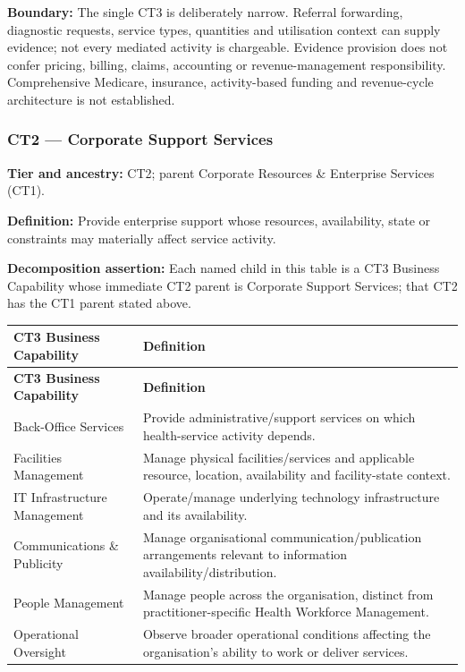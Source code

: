 \textbf{Boundary:} The single CT3 is deliberately narrow. Referral forwarding, diagnostic requests, service types, quantities and utilisation context can supply evidence; not every mediated activity is chargeable. Evidence provision does not confer pricing, billing, claims, accounting or revenue-management responsibility. Comprehensive Medicare, insurance, activity-based funding and revenue-cycle architecture is not established.

\label{rad:business:970}
\subsubsection*{CT2 — Corporate Support Services}
\label{rad:business:972}

\textbf{Tier and ancestry:} CT2; parent Corporate Resources \& Enterprise Services (CT1).

\label{rad:business:974}

\textbf{Definition:} Provide enterprise support whose resources, availability, state or constraints may materially affect service activity.

\label{rad:business:976}

\textbf{Decomposition assertion:} Each named child in this table is a CT3 Business Capability whose immediate CT2 parent is Corporate Support Services; that CT2 has the CT1 parent stated above.

\label{rad:business:978}
\begingroup\small\setlength{\TableWidth}{\dimexpr\linewidth-4\tabcolsep-3\arrayrulewidth\relax}
\begin{longtable}{|>{\raggedright\arraybackslash}p{0.35\TableWidth}|>{\raggedright\arraybackslash}p{0.65\TableWidth}|}
\hline\rowcolor{TableHead}\textbf{CT3 Business Capability} & \textbf{Definition}\\\hline\endfirsthead
\hline\rowcolor{TableHead}\textbf{CT3 Business Capability} & \textbf{Definition}\\\hline\endhead
\hline\endfoot
Back-Office Services & Provide administrative/\allowbreak{}support services on which health-service activity depends.\\\hline
Facilities Management & Manage physical facilities/\allowbreak{}services and applicable resource, location, availability and facility-state context.\\\hline
IT Infrastructure Management & Operate/\allowbreak{}manage underlying technology infrastructure and its availability.\\\hline
Communications \& Publicity & Manage organisational communication/\allowbreak{}publication arrangements relevant to information availability/\allowbreak{}distribution.\\\hline
People Management & Manage people across the organisation, distinct from practitioner-specific Health Workforce Management.\\\hline
Operational Oversight & Observe broader operational conditions affecting the organisation’s ability to work or deliver services.\\\hline
\end{longtable}\endgroup
{}\label{rad:business:987}

